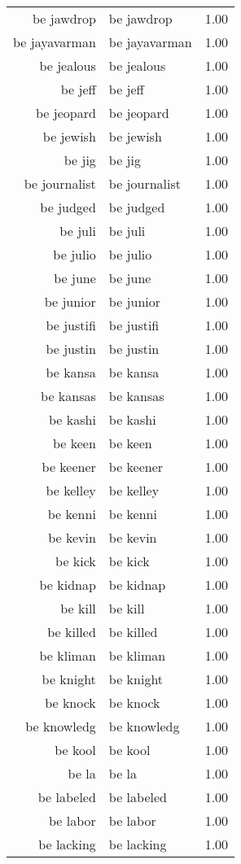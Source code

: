 \begin{table}[ht]
\begin{tabular}{rlr}
  be jawdrop & be jawdrop & 1.00 \\ 
  be jayavarman & be jayavarman & 1.00 \\ 
  be jealous & be jealous & 1.00 \\ 
  be jeff & be jeff & 1.00 \\ 
  be jeopard & be jeopard & 1.00 \\ 
  be jewish & be jewish & 1.00 \\ 
  be jig & be jig & 1.00 \\ 
  be journalist & be journalist & 1.00 \\ 
  be judged & be judged & 1.00 \\ 
  be juli & be juli & 1.00 \\ 
  be julio & be julio & 1.00 \\ 
  be june & be june & 1.00 \\ 
  be junior & be junior & 1.00 \\ 
  be justifi & be justifi & 1.00 \\ 
  be justin & be justin & 1.00 \\ 
  be kansa & be kansa & 1.00 \\ 
  be kansas & be kansas & 1.00 \\ 
  be kashi & be kashi & 1.00 \\ 
  be keen & be keen & 1.00 \\ 
  be keener & be keener & 1.00 \\ 
  be kelley & be kelley & 1.00 \\ 
  be kenni & be kenni & 1.00 \\ 
  be kevin & be kevin & 1.00 \\ 
  be kick & be kick & 1.00 \\ 
  be kidnap & be kidnap & 1.00 \\ 
  be kill & be kill & 1.00 \\ 
  be killed & be killed & 1.00 \\ 
  be kliman & be kliman & 1.00 \\ 
  be knight & be knight & 1.00 \\ 
  be knock & be knock & 1.00 \\ 
  be knowledg & be knowledg & 1.00 \\ 
  be kool & be kool & 1.00 \\ 
  be la & be la & 1.00 \\ 
  be labeled & be labeled & 1.00 \\ 
  be labor & be labor & 1.00 \\ 
  be lacking & be lacking & 1.00 \\ 

\end{tabular}
\end{table}
